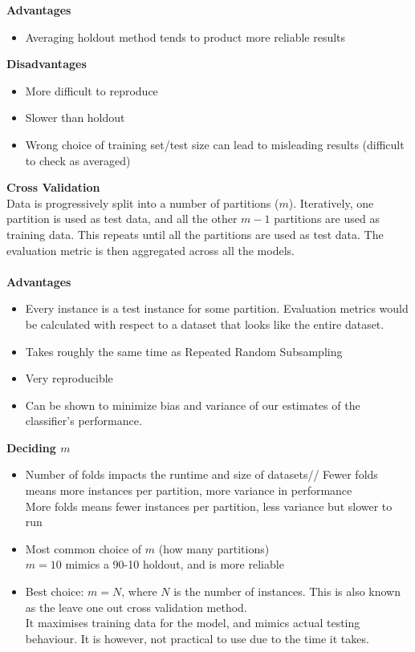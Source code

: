\documentclass[a4paper,10pt]{article}
\begin{document}
\textbf{Advantages}
\begin{itemize}
	\item Averaging holdout method tends to product more reliable results 
\end{itemize}
\textbf{Disadvantages}
\begin{itemize}
	\item More difficult to reproduce 
	\item Slower than holdout 
	\item Wrong choice of training set/test size can lead to misleading results (difficult to check as averaged)
\end{itemize}
\newpage
\noindent \textcolor{Periwinkle}{\textbf{Cross Validation}}\\
Data is progressively split into a number of partitions ($m$). Iteratively, one partition is used as test data, and all the other $m-1$ partitions are used as training data. This repeats until all the partitions are used as test data. The evaluation metric is then aggregated across all the models. \\\\
\textbf{Advantages}
\begin{itemize}
	\item Every instance is a test instance for some partition. Evaluation metrics would be calculated with respect to a dataset that looks like the entire dataset. 
	\item Takes roughly the same time as Repeated Random Subsampling 
	\item Very reproducible 
	\item Can be shown to minimize bias and variance of our estimates of the classifier's performance. 
\end{itemize}
\textbf{Deciding $m$}
\begin{itemize}
	\item Number of folds impacts the runtime and size of datasets//
	Fewer folds means more instances per partition, more variance in performance \\
	More folds means fewer instances per partition, less variance but slower to run \\
	\item Most common choice of $m$ (how many partitions) \\
	$m = 10$ mimics a 90-10 holdout, and is more reliable
	\item Best choice: $m = N$, where $N$ is the number of instances. This is also known as the leave one out cross validation method. \\
	It maximises training data for the model, and mimics actual testing behaviour. It is however, not practical to use due to the time it takes. 
\end{itemize}
\end{document}

